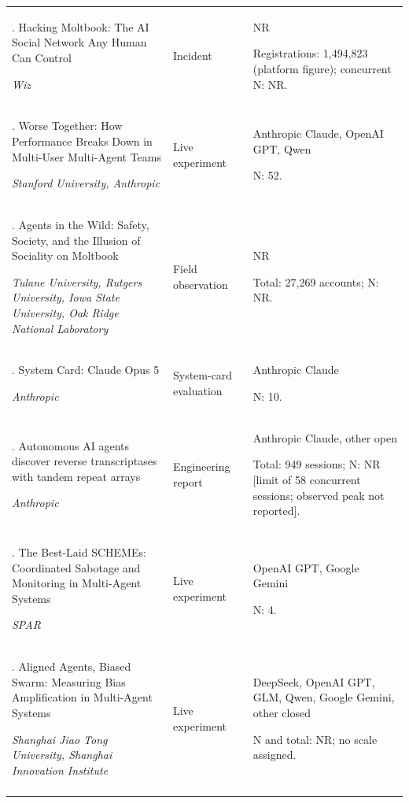 \begin{longtable}{@{}>{\raggedright\arraybackslash}p{}>{\raggedright\arraybackslash}p{}>{\raggedright\arraybackslash}p{}@{}}
143. Hacking Moltbook: The AI Social Network Any Human Can Control \citep{wiz-moltbook}\par\emph{Wiz} & Incident & NR\par Registrations: 1,494,823 (platform figure); concurrent N: NR. \\ \addlinespace[2pt]
144. Worse Together: How Performance Breaks Down in Multi-User Multi-Agent Teams \citep{worse-together}\par\emph{Stanford University, Anthropic} & Live experiment & Anthropic Claude, OpenAI GPT, Qwen\par N: 52. \\ \addlinespace[2pt]
145. Agents in the Wild: Safety, Society, and the Illusion of Sociality on Moltbook \citep{zhang-agents-in-the-wild}\par\emph{Tulane University, Rutgers University, Iowa State University, Oak Ridge National Laboratory} & Field observation & NR\par Total: 27,269 accounts; N: NR. \\ \addlinespace[2pt]
146. System Card: Claude Opus 5 \citep{opus5-card-multiagent}\par\emph{Anthropic} & System-card evaluation & Anthropic Claude\par N: 10. \\ \addlinespace[2pt]
147. Autonomous AI agents discover reverse transcriptases with tandem repeat arrays \citep{anthropic-art-enzymes}\par\emph{Anthropic} & Engineering report & Anthropic Claude, other open\par Total: 949 sessions; N: NR [limit of 58 concurrent sessions; observed peak not reported]. \\ \addlinespace[2pt]
148. The Best-Laid SCHEMEs: Coordinated Sabotage and Monitoring in Multi-Agent Systems \citep{schemes-coordinated-sabotage}\par\emph{SPAR} & Live experiment & OpenAI GPT, Google Gemini\par N: 4. \\ \addlinespace[2pt]
149. Aligned Agents, Biased Swarm: Measuring Bias Amplification in Multi-Agent Systems \citep{aligned-agents-biased-swarm}\par\emph{Shanghai Jiao Tong University, Shanghai Innovation Institute} & Live experiment & DeepSeek, OpenAI GPT, GLM, Qwen, Google Gemini, other closed\par N and total: NR; no scale assigned. \\ \addlinespace[2pt]

\end{longtable}

